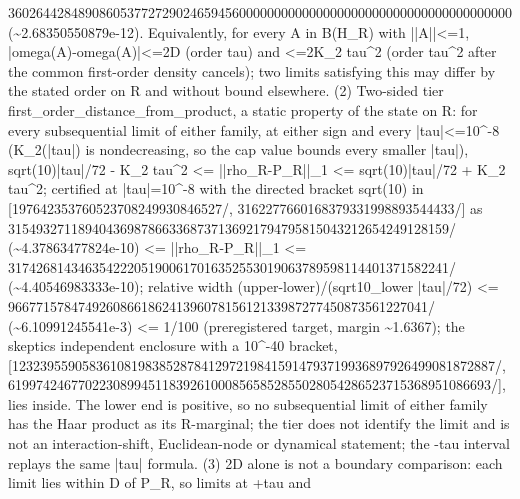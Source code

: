 \begin{gatequote}
360264428489086053772729024659456000000000000000000000000000000000000000
(\textasciitilde{}2.68350550879e-12). Equivalently, for every A in B(H\_R)
with ||A||<=1,
|omega\textquotesingle{}(A)-omega\textquotesingle{}\textquotesingle{}(A)|<=2D
(order tau) and <=2K\_2\textquotesingle{} tau\textasciicircum{}2 (order
tau\textasciicircum{}2 after the common first-order density cancels); two
limits satisfying this may differ by the stated order on R and without bound
elsewhere. (2) Two-sided tier first\_order\_distance\_from\_product, a static
property of the state on R: for every subsequential limit of either family, at
either sign and every |tau|<=10\textasciicircum{}-8
(K\_2\textquotesingle{}(|tau|) is nondecreasing, so the cap value bounds every
smaller |tau|), sqrt(10)|tau|/72 - K\_2\textquotesingle{}
tau\textasciicircum{}2 <= ||rho\_R-P\_R||\_1 <= sqrt(10)|tau|/72 +
K\_2\textquotesingle{} tau\textasciicircum{}2; certified at
|tau|=10\textasciicircum{}-8 with the directed bracket sqrt(10) in
[197642353760523708249930846527/,
3162277660168379331998893544433/] as
315493271189404369878663368737136921794795815043212654249128159/
(\textasciitilde{}4.37863477824e-10) <= ||rho\_R-P\_R||\_1 <=
317426814346354222051900617016352553019063789598114401371582241/
(\textasciitilde{}4.40546983333e-10); relative width
(upper-lower)/(sqrt10\_lower |tau|/72) <=
966771578474926086618624139607815612133987277450873561227041/
(\textasciitilde{}6.10991245541e-3) <= 1/100 (preregistered target, margin
\textasciitilde{}1.6367); the skeptic\textquotesingle{}s independent enclosure
with a 10\textasciicircum{}-40 bracket,
[123239559058361081983852878412972198415914793719936897926499081872887/,
619974246770223089945118392610008565852855028054286523715368951086693/],
lies inside. The lower end is positive, so no subsequential limit of either
family has the Haar product as its R-marginal; the tier does not identify the
limit and is not an interaction-shift, Euclidean-node or dynamical statement;
the -tau interval replays the same |tau| formula. (3) 2D alone is not a
boundary comparison: each limit lies within D of P\_R, so limits at +tau and

\end{gatequote}
